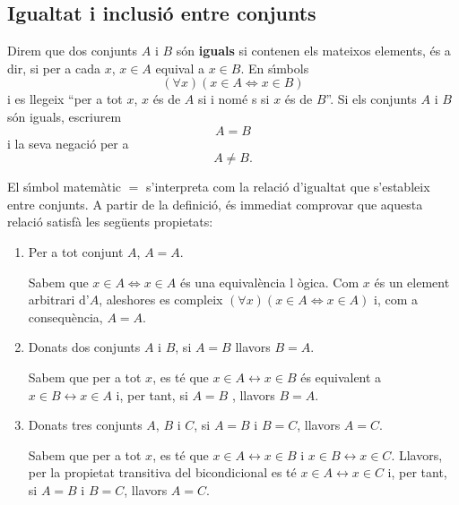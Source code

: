 \subsection{Igualtat i inclusi\'{o} entre conjunts}

Direm que dos conjunts $A$ i $B$ s\'{o}n \textbf{iguals} si contenen els
mateixos elements, \'{e}s a dir, si per a cada $x$, $x\in A$ equival a $x\in
B$. En s\'{\i}mbols
\begin{equation*}
\left( \forall x\right) \left( x\in A\Longleftrightarrow x\in B\right)
\end{equation*}
i es llegeix \textquotedblleft per a tot $x$, $x$ \'{e}s de $A$ si i nom\'{e}%
s si $x$ \'{e}s de $B$\textquotedblright. Si els conjunts $A$ i $B$ s\'{o}n
iguals, escriurem%
\begin{equation*}
A=B
\end{equation*}
i la seva negaci\'{o} per a%
\begin{equation*}
A\neq B\text{.}
\end{equation*}

El s\'{\i}mbol matem\`{a}tic $=$ s'interpreta com la relaci\'{o} d'igualtat
que s'estableix entre conjunts. A partir de la definici\'{o}, \'{e}s
immediat comprovar que aquesta relaci\'{o} satisf\`{a} les seg\"{u}ents
propietats:

\begin{enumerate}
\item Per a tot conjunt $A$, $A=A$.

\begin{prova}
Sabem que $x\in A\Longleftrightarrow x\in A$ \'{e}s una equival\`{e}ncia l%
\`{o}gica. Com $x$ \'{e}s un element arbitrari d'$A$, aleshores es compleix $%
\left( \forall x\right) \left( x\in A\Longleftrightarrow x\in A\right) $ i,
com a consequ\`{e}ncia, $A=A$.
\end{prova}

\item Donats dos conjunts $A$ i $B$, si $A=B$ llavors $B=A$.

\begin{prova}
Sabem que per a tot $x$, es t\'{e} que $x\in A\longleftrightarrow x\in B$
\'{e}s equivalent a $x\in B\longleftrightarrow x\in A$ i, per tant, si $A=B$%
, llavors $B=A$.
\end{prova}

\item Donats tres conjunts $A$, $B$ i $C$, si $A=B$ i $B=C$, llavors $A=C$.

\begin{prova}
Sabem que per a tot $x$, es t\'{e} que $x\in A\longleftrightarrow x\in B$ i $%
x\in B\longleftrightarrow x\in C$. Llavors, per la propietat transitiva del
bicondicional es t\'{e} $x\in A\longleftrightarrow x\in C$ i, per tant, si $%
A=B$ i $B=C$, llavors $A=C$.
\end{prova}
\end{enumerate}

